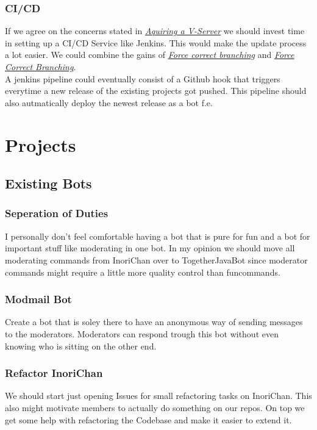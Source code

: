\documentclass{article}
\newcommand{\refsection}[2]{\hyperref[#1]{\underline{\textit{#2}}}}
\begin{document}
    \subsubsection{CI/CD}
    If we agree on the concerns stated in \hyperref[sec:vserver]{\underline{\textit{Aquiring a V-Server}}} we should invest time in setting up a CI/CD Service like Jenkins.
    This would make the update process a lot easier. We could combine the gains of \refsection{sec:forcecorrectbranching}{Force correct branching} 
    and \refsection{sec:forcepullrequests}{Force Correct Branching}. \\ 
    A jenkins pipeline could eventually consist of a Github hook that triggers everytime a new release of the existing projects got pushed. 
    This pipeline should also autmatically deploy the newest release as a bot f.e.

    \section{Projects}

    \subsection{Existing Bots}

    \subsubsection{Seperation of Duties}
    I personally don't feel comfortable having a bot that is pure for fun and a bot for important stuff like moderating in one bot. 
    In my opinion we should move all moderating commands from InoriChan over to TogetherJavaBot since moderator commands might require a little more quality control than funcommands.

    \subsubsection{Modmail Bot}
    \label{sec:modmailbot}
    Create a bot that is soley there to have an anonymous way of sending messages to the moderators. 
    Moderators can respond trough this bot without even knowing who is sitting on the other end.

    \subsubsection{Refactor InoriChan}
    We should start just opening Issues for small refactoring tasks on InoriChan. 
    This also might motivate members to actually do something on our repos. 
    On top we get some help with refactoring the Codebase and make it easier to extend it.
\end{document}
